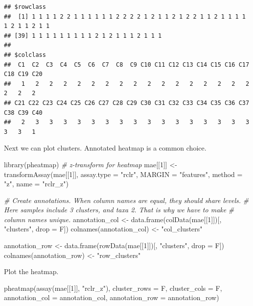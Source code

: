 \documentclass[
]{book}
\newenvironment{Shaded}{\begin{snugshade}}{\end{snugshade}}
\newcommand{\AttributeTok}[1]{\textcolor[rgb]{0.77,0.63,0.00}{#1}}
\newcommand{\CommentTok}[1]{\textcolor[rgb]{0.56,0.35,0.01}{\textit{#1}}}
\newcommand{\DecValTok}[1]{\textcolor[rgb]{0.00,0.00,0.81}{#1}}
\newcommand{\FunctionTok}[1]{\textcolor[rgb]{0.00,0.00,0.00}{#1}}
\newcommand{\NormalTok}[1]{#1}
\newcommand{\OtherTok}[1]{\textcolor[rgb]{0.56,0.35,0.01}{#1}}
\newcommand{\StringTok}[1]{\textcolor[rgb]{0.31,0.60,0.02}{#1}}
\begin{document}
\begin{verbatim}
## $rowclass
##  [1] 1 1 1 1 2 2 1 1 1 1 1 1 2 2 2 2 1 2 1 1 2 1 2 2 1 1 2 1 1 1 1 1 2 1 1 2 1 1
## [39] 1 1 1 1 1 1 1 1 1 2 1 2 1 1 1 2 1 1 1
## 
## $colclass
##  C1  C2  C3  C4  C5  C6  C7  C8  C9 C10 C11 C12 C13 C14 C15 C16 C17 C18 C19 C20 
##   1   2   2   2   2   2   2   2   2   2   2   2   2   2   2   2   2   2   2   2 
## C21 C22 C23 C24 C25 C26 C27 C28 C29 C30 C31 C32 C33 C34 C35 C36 C37 C38 C39 C40 
##   2   3   3   3   3   3   3   3   3   3   3   3   3   3   3   3   3   3   3   1
\end{verbatim}

Next we can plot clusters. Annotated heatmap is a common choice.

\begin{Shaded}
\begin{Highlighting}[]
\FunctionTok{library}\NormalTok{(pheatmap)}
\CommentTok{\# z{-}transform for heatmap}
\NormalTok{mae[[}\DecValTok{1}\NormalTok{]] }\OtherTok{\textless{}{-}} \FunctionTok{transformAssay}\NormalTok{(mae[[}\DecValTok{1}\NormalTok{]], }\AttributeTok{assay.type =} \StringTok{"rclr"}\NormalTok{,}
                            \AttributeTok{MARGIN =} \StringTok{"features"}\NormalTok{, }\AttributeTok{method =} \StringTok{"z"}\NormalTok{, }\AttributeTok{name =} \StringTok{"rclr\_z"}\NormalTok{)}

\CommentTok{\# Create annotations. When column names are equal, they should share levels.}
\CommentTok{\# Here samples include 3 clusters, and taxa 2. That is why we have to make}
\CommentTok{\# column names unique.}
\NormalTok{annotation\_col }\OtherTok{\textless{}{-}} \FunctionTok{data.frame}\NormalTok{(}\FunctionTok{colData}\NormalTok{(mae[[}\DecValTok{1}\NormalTok{]])[, }\StringTok{"clusters"}\NormalTok{, }\AttributeTok{drop =}\NormalTok{ F])}
\FunctionTok{colnames}\NormalTok{(annotation\_col) }\OtherTok{\textless{}{-}} \StringTok{"col\_clusters"}

\NormalTok{annotation\_row }\OtherTok{\textless{}{-}} \FunctionTok{data.frame}\NormalTok{(}\FunctionTok{rowData}\NormalTok{(mae[[}\DecValTok{1}\NormalTok{]])[, }\StringTok{"clusters"}\NormalTok{, }\AttributeTok{drop =}\NormalTok{ F])}
\FunctionTok{colnames}\NormalTok{(annotation\_row) }\OtherTok{\textless{}{-}} \StringTok{"row\_clusters"}
\end{Highlighting}
\end{Shaded}

Plot the heatmap.

\begin{Shaded}
\begin{Highlighting}[]
\FunctionTok{pheatmap}\NormalTok{(}\FunctionTok{assay}\NormalTok{(mae[[}\DecValTok{1}\NormalTok{]], }\StringTok{"rclr\_z"}\NormalTok{), }\AttributeTok{cluster\_rows =}\NormalTok{ F, }\AttributeTok{cluster\_cols =}\NormalTok{ F,}
         \AttributeTok{annotation\_col =}\NormalTok{ annotation\_col, }\AttributeTok{annotation\_row =}\NormalTok{ annotation\_row)}
\end{Highlighting}
\end{Shaded}
\end{document}
